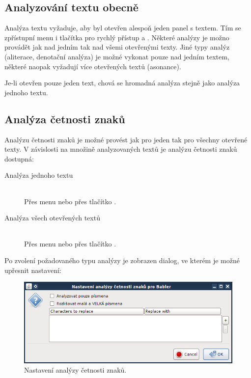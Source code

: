 \documentclass[dp.tex]{subfiles}
\begin{document}
\subsection{Analyzování textu obecně}

Analýza textu vyžaduje, aby byl otevřen alespoň jeden panel s textem. Tím se zpřístupní menu  i tlačítka pro rychlý přístup  a .  Některé analýzy je možno provádět jak nad jedním tak nad všemi otevřenými texty. Jiné typy analýz (aliterace, denotační analýza) je možné vykonat pouze nad jedním textem, některé naopak vyžadují více otevřených textů (asonance).

Je-li otevřen pouze jeden text, chová se hromadná analýza stejně jako analýza jednoho textu.

\subsection{Analýza četnosti znaků}
\label{chap:analyza-cetnosti-znaku}

Analýzu četnosti znaků je možné provést jak pro jeden tak pro všechny otevřené texty. V závislosti na množině analyzovaných textů je analýzu četnosti znaků dostupná:
\begin{description}
  \item[Analýza jednoho textu] \hfill \\
	Přes menu  nebo přes tlačítko .
  \item[Analýza všech otevřených textů] \hfill \\
	Přes menu  nebo přes tlačítko .
\end{description}

Po zvolení požadovaného typu analýzy je zobrazen dialog, ve kterém je možné upřesnit nastavení:

\begin{figure}[H]
\centering
\includegraphics[max width=\textwidth,keepaspectratio=true]{imgs-60-aplikace/gui-character-analysis-dialog}
\caption{Nastavení analýzy četnosti znaků.}
\label{fig:gui-character-analysis-dialog}
\end{figure}
\end{document}
